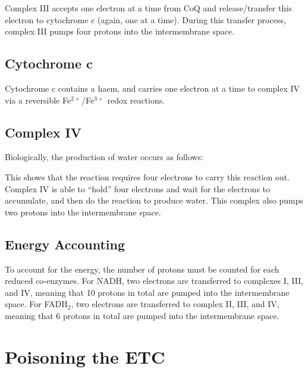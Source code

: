 Complex III accepts one electron at a time from CoQ and release/transfer this electron to cytochrome c (again, one at a time).
During this transfer process, complex III pumps four protons into the intermembrane space.

\subsection{Cytochrome c}

Cytochrome c contains a haem, and carries one electron at a time to complex IV via a reversible Fe$^{2+}$/Fe$^{3+}$ redox reactions.

\subsection{Complex IV}

Biologically, the production of water occurs as follows:

\begin{center}
\end{center}

This shows that the reaction requires four electrons to carry this reaction out.
Complex IV is able to ``hold'' four electrons and wait for the electrons to accumulate, and then do the reaction to produce water.
This complex also pumps two protons into the intermembrane space.

\subsection{Energy Accounting}

To account for the energy, the number of protons must be counted for each reduced co-enzymes.
For NADH, two electrons are transferred to complexes I, III, and IV, meaning that 10 protons in total are pumped into the intermembrane space.
For FADH$_2$, two electrons are transferred to complex II, III, and IV, meaning that 6 protons in total are pumped into the intermembrane space.

\section{Poisoning the ETC}



























